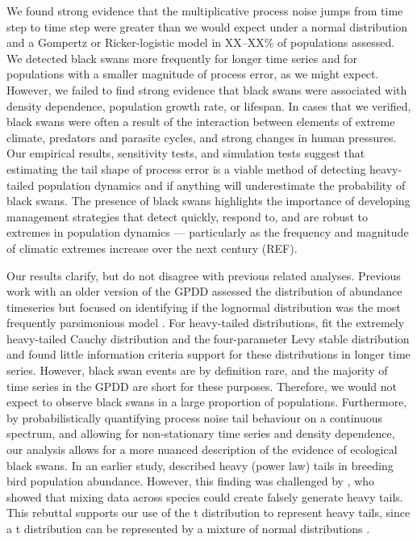 We found strong evidence that the multiplicative process noise jumps from time
step to time step were greater than we would expect under a normal distribution
and a Gompertz or Ricker-logistic model in XX--XX\% of populations assessed. We
detected black swans more frequently for longer time series and for populations
with a smaller magnitude of process error, as we might expect. However, we
failed to find strong evidence that black swans were associated with density
dependence, population growth rate, or lifespan. In cases that we verified,
black swans were often a result of the interaction between elements of extreme
climate, predators and parasite cycles, and strong changes in human pressures.
Our empirical results, sensitivity tests, and simulation tests suggest that
estimating the tail shape of process error is a viable method of detecting
heavy-tailed population dynamics and if anything will underestimate the
probability of black swans. The presence of black swans highlights the
importance of developing management strategies that detect quickly, respond
to, and are robust to extremes in population dynamics --- particularly as the
frequency and magnitude of climatic extremes increase over the next century
(REF).

Our results clarify, but do not disagree with previous related analyses.
Previous work with an older version of the GPDD assessed the distribution of
abundance timeseries but focused on identifying if the lognormal distribution
was the most frequently parsimonious model \citep{halley2002}. For heavy-tailed
distributions, \citet{halley2002} fit the extremely heavy-tailed Cauchy
distribution and the four-parameter Levy stable distribution and found little
information criteria support for these distributions in longer time series.
However, black swan events are by definition rare, and the majority of time
series in the GPDD are short for these purposes. Therefore, we would not expect
to observe black swans in a large proportion of populations. Furthermore, by
probabilistically quantifying process noise tail behaviour on a continuous
spectrum, and allowing for non-stationary time series and density dependence,
our analysis allows for a more nuanced description of the evidence of
ecological black swans. In an earlier study, \citet{keitt1998} described heavy
(power law) tails in breeding bird population abundance. However, this finding
was challenged by \citet{allen2001}, who showed that mixing data across species
could create falsely generate heavy tails. This rebuttal supports our use of
the t distribution to represent heavy tails, since a t distribution can be
represented by a mixture of normal distributions \citep[with
inverse-gamma-distributed variances,][]{gelman2014}.

